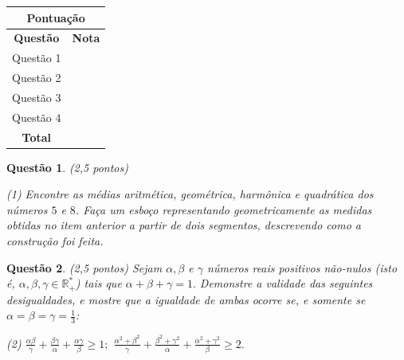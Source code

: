 \documentclass[oneside,a4paper,12pt]{article}
\newcommand{\negrito}[1]{\mbox{\boldmath{$#1$}}}
\theoremstyle{Colorido}
\theoremstyle{solu}
\theoremstyle{dotlessP}
\newtheorem{sol}{Questão}
\begin{document}
	\vspace{24pt}
	\vspace{40pt}
	\begin{center}
		\begin{tabular}{ |c|p{1.2cm}| }
		
		\hline
		\multicolumn{2}{|c|}{\textbf{Pontuação}} \\
			\hline
		\centering\textbf{Questão}        &  \textbf{Nota}\\
		\hline
		Questão 1        &\\
		\hline
		Questão 2        &\\
		\hline
		Questão 3        &\\
		\hline
		Questão 4        &\\
		\hline
		\textbf{Total}        &\\
		\hline
	\end{tabular}
	\end{center}
	\vspace{24pt}
	
	\newpage	
	\begin{sol}
\textit{(2,5 pontos)} 

\begin{tasks}[counter-format={(tsk[a])},label-width=3.6ex, label-format = {\bfseries}, column-sep = {20pt}](1)
\task[\textcolor{blue}{$\negrito{(a)} $}] Encontre as médias aritmética, geométrica, harmônica e quadrática dos números $5$ e $8$.
\task[\textcolor{blue}{$\negrito{(b)} $}] Faça um esboço representando geometricamente as medidas obtidas no item anterior a partir de dois segmentos, descrevendo como a construção foi feita.
\end{tasks}
\end{sol}
		\newpage	
	\begin{sol}
\textit{(2,5 pontos)} \newline \newline
Sejam $\alpha, \beta$ e $\gamma$ números reais positivos não-nulos (isto é, $\alpha, \beta, \gamma \in \mathbb{R}^{*}_{+}$) tais que $\alpha + \beta + \gamma = 1.$ Demonstre a validade das seguintes desigualdades, e mostre que a igualdade de ambas ocorre se, e somente se $\alpha = \beta = \gamma = \frac{1}{3}$:
\begin{tasks}[counter-format={(tsk[a])},label-width=3.6ex, label-format = {\bfseries}, column-sep = {20pt}](2)
\task[\textcolor{blue}{$\negrito{(a)} $}] $\frac{\alpha \beta}{\gamma} + \frac{\beta \gamma}{\alpha} + \frac{\alpha \gamma}{\beta} \ge 1;$
\task[\textcolor{blue}{$\negrito{(b)} $}] $\frac{\alpha^2 + \beta^2}{\gamma} + \frac{\beta^2 + \gamma^2}{\alpha} + \frac{\alpha^2 + \gamma^2}{\beta} \ge 2.$
\end{tasks}
\end{sol}
\end{document}
